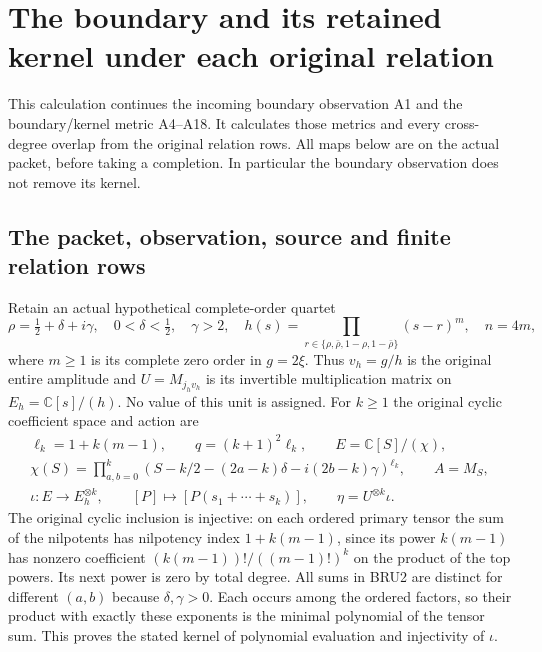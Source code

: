 \section{The boundary and its retained kernel under each original relation}
\label{GraphV3:reader-v3-BRU:sec:bru-original-relations}

This calculation continues the incoming boundary observation A1 and the
boundary/kernel metric A4--A18. It calculates those metrics and every
cross-degree overlap from the original relation rows. All maps below are
on the actual packet, before taking a completion. In particular the
boundary observation does not remove its kernel.

\subsection{The packet, observation, source and finite relation rows}

Retain an actual hypothetical complete-order quartet
\[
 \rho=\tfrac12+\delta+i\gamma,\quad 0<\delta<\tfrac12,\quad\gamma>2,
 \quad h(s)=\prod_{r\in\{\rho,\bar\rho,1-\rho,1-\bar\rho\}}(s-r)^m,
 \quad n=4m,
 \tag{BRU1}
\]
where $m\geq1$ is its complete zero order in $g=2\xi$.
Thus $v_h=g/h$ is the original entire amplitude and
$U=M_{j_hv_h}$ is its invertible multiplication matrix on
$E_h=\mathbb{C}[s]/(h)$. No value of this unit is assigned.
For $k\geq1$ the original cyclic coefficient space and action are
\[
 \begin{gathered}
 \ell_k=1+k(m-1),\qquad q=(k+1)^2\ell_k,\qquad E=\mathbb{C}[S]/(\chi),\\
 \chi(S)=\prod_{a,b=0}^k
 (S-k/2-(2a-k)\delta-i(2b-k)\gamma)^{\ell_k},\qquad
 A=M_S,\\
 \iota:E\longrightarrow E_h^{\otimes k},\qquad
 [P]\longmapsto[P(s_1+\cdots+s_k)],\qquad
 \eta=U^{\otimes k}\iota .
 \end{gathered}\tag{BRU2}
\]
The original cyclic inclusion is injective: on each ordered primary
tensor the sum of the nilpotents has nilpotency index
$1+k(m-1)$, since its power $k(m-1)$ has nonzero coefficient
$(k(m-1))!/((m-1)!)^k$ on the product of the top powers. Its next
power is zero by total degree. All sums in BRU2 are distinct for
different $(a,b)$ because $\delta,\gamma>0$. Each occurs among the
ordered factors, so their product with exactly these exponents is
the minimal polynomial of the tensor sum. This proves the stated
kernel of polynomial evaluation and injectivity of $\iota$.

